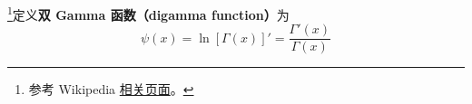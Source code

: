 
\begin{issues}
\issueDraft
\end{issues}


\footnote{参考 Wikipedia \href{https://en.wikipedia.org/wiki/Digamma_function}{相关页面}。}定义\textbf{双 Gamma 函数（digamma function）}为
\begin{equation}
\psi(x) = \ln[\Gamma(x)]' = \frac{\Gamma'(x)}{\Gamma(x)}
\end{equation}

